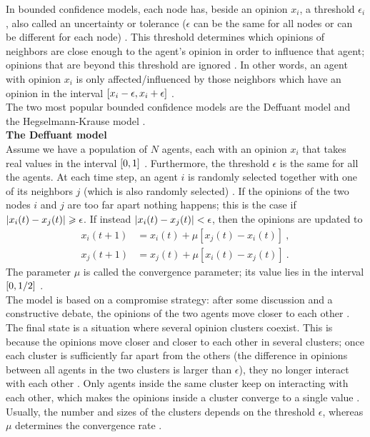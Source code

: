 \documentclass[11 pt , letterpaper , twoside , openright]{book}
\begin{document}
In bounded confidence models, each node has, beside an opinion $x_i$, a threshold $\epsilon_i$, also called an uncertainty or tolerance ($\epsilon$ can be the same for all nodes or can be different for each node) \cite{Castellano2009}\cite{Deffuant2006}. This threshold determines which opinions of neighbors are close enough to the agent's opinion in order to influence that agent; opinions that are beyond this threshold are ignored \cite{Deffuant2006}. In other words, an agent with opinion $x_i$ is only affected/influenced by those neighbors which have an opinion in the interval $\interval{x_i-\epsilon}{x_i+\epsilon}$ \cite{Castellano2009}. \\
\newline
The two most popular bounded confidence models are the Deffuant model and the Hegselmann-Krause model \cite{Castellano2009}. \\
\newline
\textbf{The Deffuant model}\\
\newline
Assume we have a population of $N$ agents, each with an opinion $x_i$ that takes real values in the interval $\interval{0}{1}$ \cite{Castellano2009}. Furthermore, the threshold $\epsilon$ is the same for all the agents. At each time step, an agent $i$ is randomly selected together with one of its neighbors $j$ (which is also randomly selected) \cite{Castellano2009}. If the opinions of the two nodes $i$ and $j$ are too far apart nothing happens; this is the case if $\abs{x_i(t) - x_j(t)} \geqslant \epsilon$. If instead $\abs{x_i(t) - x_j(t)} < \epsilon$, then the opinions are updated to \cite{Castellano2009}\cite{Deffuant2000}
\begin{equation}
\begin{split}
	x_i(t+1) &= x_i(t) + \mu [x_j(t) - x_i(t)] \ ,\\
	x_j(t+1) &= x_j(t) + \mu [x_i(t) - x_j(t)] \ .
\end{split}
\end{equation}
The parameter $\mu$ is called the convergence parameter; its value lies in the interval $\interval{0}{1/2}$ \cite{Castellano2009}. \\
\newline
The model is based on a compromise strategy: after some discussion and a constructive debate, the opinions of the two agents move closer to each other \cite{Castellano2009}. The final state is a situation where several opinion clusters coexist. This is because the opinions move closer and closer to each other in several clusters; once each cluster is sufficiently far apart from the others (the difference in opinions between all agents in the two clusters is larger than $\epsilon$), they no longer interact with each other \cite{Castellano2009}. Only agents inside the same cluster keep on interacting with each other, which makes the opinions inside a cluster converge to a single value \cite{Castellano2009}. Usually, the number and sizes of the clusters depends on the threshold $\epsilon$, whereas $\mu$ determines the convergence rate \cite{Castellano2009}.\\
\end{document}
